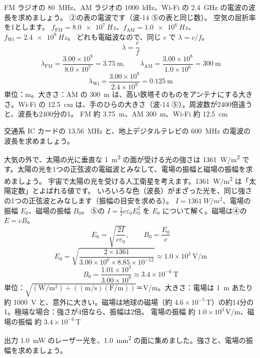\begin{phreidai}
\label{ph:電-15:ex2}FM ラジオの \qty{80}{MHz}、AM ラジオの \qty{1000}{kHz}、Wi-Fi の \qty{2.4}{GHz} の電波の波長を求めましょう。
\phbamen
②の表の電波です（波-14 ⑤の表と同じ数）。
\phmushi
空気の屈折率を1とします。
\phzu
$f_{\mathrm{FM}}=\qty{8.0e7}{Hz}$、$f_{\mathrm{AM}}=\qty{1.0e6}{Hz}$、$f_{\mathrm{Wi}}=\qty{2.4e9}{Hz}$。
\phriyu
どれも電磁波なので、同じ $c$ で $\lambda=c/f$。
\phtateru
\[ \lambda=\frac{c}{f} \]
\phtoku
\[ \lambda_{\mathrm{FM}}=\frac{3.00\times10^8}{8.0\times10^7}=3.75\ \mathrm{m},\qquad \lambda_{\mathrm{AM}}=\frac{3.00\times10^8}{1.0\times10^6}=300\ \mathrm{m} \]
\[ \lambda_{\mathrm{Wi}}=\frac{3.00\times10^8}{2.4\times10^9}=0.125\ \mathrm{m} \]
\phtashikame
単位：m。大きさ：AM の \qty{300}{m} は、高い鉄塔そのものをアンテナにする大きさ。Wi-Fi の \qty{12.5}{cm} は、手のひらの大きさ（波-14 ⑤）。周波数が2400倍違うと、波長も2400分の1。
\kotae FM 約 \qty{3.75}{m}、AM \qty{300}{m}、Wi-Fi 約 \qty{12.5}{cm}
\end{phreidai}
\begin{jibun}
交通系 IC カードの \qty{13.56}{MHz} と、地上デジタルテレビの \qty{600}{MHz} の電波の波長を求めましょう。
\end{jibun}

\begin{phreidai}[太陽の光の電場と磁場]
\label{ph:電-15:ex3}大気の外で、太陽の光に垂直な \qty{1}{m^2} の面が受ける光の強さは \qty{1361}{W/m^2} です。太陽の光を1つの正弦波の電磁波とみなして、電場の振幅と磁場の振幅を求めましょう。
\phbamen
宇宙で太陽の光を受ける人工衛星を考えます。\qty{1361}{W/m^2} は「太陽定数」とよばれる値です。
\phmushi
いろいろな色（波長）がまざった光を、同じ強さの1つの正弦波とみなします（振幅の目安を求める）。
\phzu
$I=\qty{1361}{W/m^2}$、電場の振幅 $E_0$、磁場の振幅 $B_0$。
\phriyu
⑤の $I=\tfrac12c\varepsilon_0E_0^2$ を $E_0$ について解く。磁場は④の $E=cB$。
\phtateru
\[ E_0=\sqrt{\frac{2I}{c\varepsilon_0}},\qquad B_0=\frac{E_0}{c} \]
\phtoku
\[ E_0=\sqrt{\frac{2\times1361}{3.00\times10^8\times8.85\times10^{-12}}}\approx1.0\times10^3\ \mathrm{V/m} \]
\[ B_0=\frac{1.01\times10^3}{3.00\times10^8}\approx3.4\times10^{-6}\ \mathrm{T} \]
\phtashikame
単位：$\sqrt{(\mathrm{W/m^2})\div((\mathrm{m/s})(\mathrm{F/m}))}$＝V/m。大きさ：電場は \qty{1}{m} あたり約 \qty{1000}{V} と、意外に大きい。磁場は地球の磁場（約 $4.6\times10^{-5}$\,T）の約14分の1。極端な場合：強さが4倍なら、振幅は2倍。
\kotae 電場の振幅 約 $1.0\times10^3$\,V/m、磁場の振幅 約 $3.4\times10^{-6}$\,T
\end{phreidai}
\begin{jibun}
出力 \qty{1.0}{mW} のレーザー光を、\qty{1.0}{mm^2} の面に集めました。強さと、電場の振幅を求めましょう。
\end{jibun}

